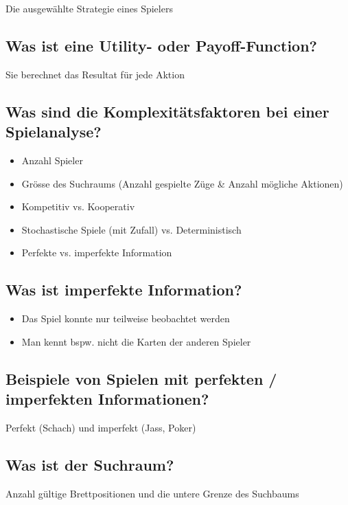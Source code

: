 \documentclass[a4paper]{article}
\begin{document}
		Die ausgewählte Strategie eines Spielers
		
		\subsection{Was ist eine Utility- oder Payoff-Function?}
		
		Sie berechnet das Resultat für jede Aktion
		
		\subsection{Was sind die Komplexitätsfaktoren bei einer Spielanalyse?}
		
		\begin{itemize}
			\item Anzahl Spieler
			\item Grösse des Suchraums (Anzahl gespielte Züge \& Anzahl mögliche Aktionen)
			\item Kompetitiv vs. Kooperativ
			\item Stochastische Spiele (mit Zufall) vs. Deterministisch
			\item Perfekte vs. imperfekte Information
		\end{itemize}
	
		\subsection{Was ist imperfekte Information?}
		
		\begin{itemize}
			\item Das Spiel konnte nur teilweise beobachtet werden
			\item Man kennt bspw. nicht die Karten der anderen Spieler
		\end{itemize}
	
		\subsection{Beispiele von Spielen mit perfekten / imperfekten Informationen?}
		
		Perfekt (Schach) und imperfekt (Jass, Poker)
		
		\subsection{Was ist der Suchraum?}
		
		Anzahl gültige Brettpositionen und die untere Grenze des Suchbaums
		
\end{document}
